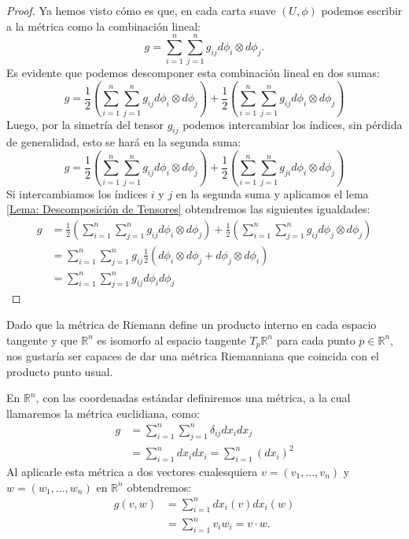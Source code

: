 \begin{proof}
	Ya hemos visto cómo es que, en cada carta suave $(U,\phi)$ podemos escribir a la métrica como la combinación lineal:
	\[
		g = \sum_{i=1}^{n}\sum_{j=1}^{n} g_{ij} d\phi_{i} \otimes d\phi_j.
	\]
	Es evidente que podemos descomponer esta combinación lineal en dos sumas:
	\[
		g = \frac{1}{2}\left(\sum_{i=1}^{n}\sum_{j=1}^{n} g_{ij} d\phi_{i} \otimes d\phi_j \right)
		+ \frac{1}{2}\left(\sum_{i=1}^{n}\sum_{j=1}^{n} g_{ij} d\phi_{i} \otimes d\phi_j \right)
	\]
	Luego, por la simetría del tensor $g_{ij}$ podemos intercambiar los índices, sin pérdida de generalidad, esto se hará en la segunda suma:
	\[
		g = \frac{1}{2}\left(\sum_{i=1}^{n}\sum_{j=1}^{n} g_{ij} d\phi_{i} \otimes d\phi_j \right)
		+ \frac{1}{2}\left(\sum_{i=1}^{n}\sum_{j=1}^{n} g_{ji} d\phi_{i} \otimes d\phi_j \right)
	\]
	Si intercambiamos los índices $i$ y $j$ en la segunda suma y aplicamos el lema \ref{Lema: Descomposición de Tensores} obtendremos las siguientes igualdades:
	\begin{align*}
		g & = \frac{1}{2}\left(\sum_{i=1}^{n}\sum_{j=1}^{n} g_{ij} d\phi_{i} \otimes d\phi_{j} \right)
		+
		\frac{1}{2}\left(\sum_{i=1}^{n}\sum_{j=1}^{n} g_{ij} d\phi_{j} \otimes d\phi_{j} \right)                                      \\
		  & = \sum_{i=1}^{n}\sum_{j=1}^{n} g_{ij} \frac{1}{2} \left( d\phi_{i} \otimes d\phi_{j} + d\phi_{j} \otimes d\phi_{i}\right) \\
		  & = \sum_{i=1}^{n}\sum_{j=1}^{n} g_{ij} d\phi_{i}  d\phi_{j}
	\end{align*}
\end{proof}


\begin{example}
	Dado que la métrica de Riemann define un producto interno en cada espacio tangente y que $\mathbb{R}^{n}$ es isomorfo al espacio tangente $T_{p}\mathbb{R}^{n}$ para cada punto $p \in \mathbb{R}^{n}$, nos gustaría ser capaces de dar una métrica Riemanniana que coincida con el producto punto usual.

	En $\mathbb{R}^{n}$, con las coordenadas estándar definiremos una métrica, a la cual llamaremos la métrica euclidiana, como:
	\begin{align*}
		g & = \sum_{i=1}^{n} \sum_{j=1}^{n} \delta_{ij}dx_{i}dx_{j}     \\
		  & = \sum_{i=1}^{n} dx_{i}dx_{i} = \sum_{i=1}^{n} (dx_{i})^{2}
	\end{align*}
	Al aplicarle esta métrica a dos vectores cualesquiera $v = (v_1, \ldots, v_n)$ y $w = (w_1, \ldots, w_n)$ en $\mathbb{R}^{n}$ obtendremos:
	\begin{align*}
		g(v,w) & = \sum_{i=1}^{n} dx_{i}(v)dx_{i}(w)   \\
		       & = \sum_{i=1}^{n} v_i w_i = v \cdot w.
	\end{align*}
\end{example}

